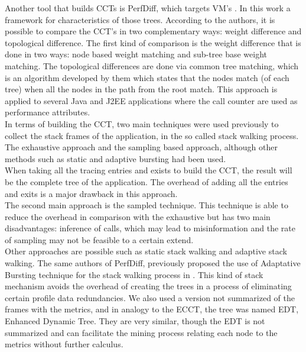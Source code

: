 Another tool that builds CCTs is PerfDiff, which targets VM’s \cite{perfdiff}. In this work a framework for characteristics of those trees. According to the authors, it is possible to compare the CCT’s in two complementary ways: weight difference and topological difference. The first kind of comparison is the weight difference that is done in two ways: node based weight matching and sub-tree base weight matching. The topological differences are done via common tree matching, which is an algorithm developed by them which states that the nodes match (of each tree) when all the nodes in the path from the root match. This approach is applied to several Java and J2EE applications where the call counter are used as performance attributes.\\
In terms of building the CCT, two main techniques were used previously to collect the stack frames of the application, in the so called stack walking process. The exhaustive approach and the sampling based approach, although other methods such as static and adaptive bursting had been used.\\
When taking all the tracing entries and exists to build the CCT, the result will be the complete tree of the application. The overhead of adding all the entries and exits is a major drawback in this approach.\\
The second main approach is the sampled technique. This technique is able to reduce the overhead in comparison with the exhaustive but has two main disadvantages: inference of calls, which may lead to misinformation and the rate of sampling may not be feasible to a certain extend.\\
Other approaches are possible such as static stack walking and adaptive stack walking. The same authors of PerfDiff, previously proposed the use of Adaptative Bursting technique for the stack walking process in \cite{adaptative_burst}. This kind of stack mechanism avoids the overhead of creating the trees in a process of eliminating certain profile data redundancies.
We also used a version not summarized of the frames with the metrics, and in analogy to the ECCT, the tree was named EDT, Enhanced Dynamic Tree. They are very similar, though the EDT is not summarized and can facilitate the mining process relating each node to the metrics without further calculus. 
